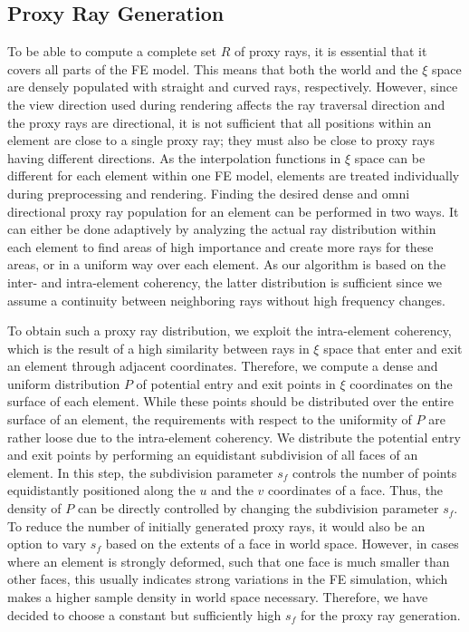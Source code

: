 \documentclass[journal]{vgtc}                %
\begin{document}
\subsection{Proxy Ray Generation}\label{subsec:proxyraygeneration}
To be able to compute a complete set $R$ of proxy rays, it is essential that it covers all parts of the FE model. This means that both the world and the $\xi$ space are densely populated with straight and curved rays, respectively. However, since the view direction used during rendering affects the ray traversal direction and the proxy rays are directional, it is not sufficient that all positions within an element are close to a single proxy ray; they must also be close to proxy rays having different directions. As the interpolation functions in $\xi$ space can be different for each element within one FE model, elements are treated individually during preprocessing and rendering. Finding the desired dense and omni directional proxy ray population for an element can be performed in two ways. It can either be done adaptively by analyzing the actual ray distribution within each element to find areas of high importance and create more rays for these areas, or in a uniform way over each element. As our algorithm is based on the inter- and intra-element coherency, the latter distribution is sufficient since we assume a continuity between neighboring rays without high frequency changes.

To obtain such a proxy ray distribution, we exploit the intra-element coherency, which is the result of a high similarity between rays in $\xi$ space that enter and exit an element through adjacent coordinates. Therefore, we compute a dense and uniform distribution $P$ of potential entry and exit points in $\xi$ coordinates on the surface of each element. While these points should be distributed over the entire surface of an element, the requirements with respect to the uniformity of $P$ are rather loose due to the intra-element coherency. We distribute the potential entry and exit points by performing an equidistant subdivision of all faces of an element. In this step, the subdivision parameter $s_f$ controls the number of points equidistantly positioned along the $u$ and the $v$ coordinates of a face. Thus, the density of $P$ can be directly controlled by changing the subdivision parameter $s_f$. To reduce the number of initially generated proxy rays, it would also be an option to vary $s_f$ based on the extents of a face in world space. However, in cases where an element is strongly deformed, such that one face is much smaller than other faces, this usually indicates strong variations in the FE simulation, which makes a higher sample density in world space necessary. Therefore, we have decided to choose a constant but sufficiently high $s_f$ for the proxy ray generation.
\end{document}
